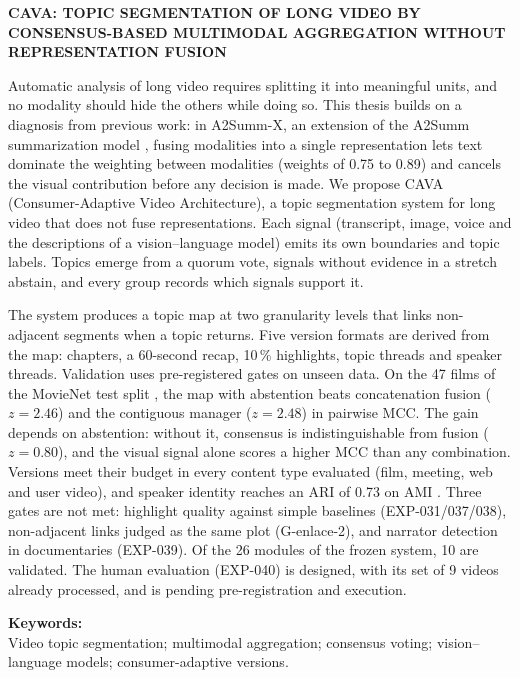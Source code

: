 
\begin{center}
\large \vspace{-1.5cm} \textbf{CAVA: TOPIC SEGMENTATION OF LONG VIDEO BY CONSENSUS-BASED MULTIMODAL AGGREGATION WITHOUT REPRESENTATION FUSION}
\end{center}

Automatic analysis of long video requires splitting it into meaningful units, and no
modality should hide the others while doing so. This thesis builds on a diagnosis from
previous work: in A2Summ-X, an extension of the A2Summ summarization model
\cite{he2023a2summ}, fusing modalities into a single representation lets text dominate the
weighting between modalities (weights of 0.75 to 0.89) and cancels the visual contribution
before any decision is made. We propose CAVA (Consumer-Adaptive Video Architecture), a topic
segmentation system for long video that does not fuse representations. Each signal
(transcript, image, voice and the descriptions of a vision--language model) emits its own
boundaries and topic labels. Topics emerge from a quorum vote, signals without evidence in a
stretch abstain, and every group records which signals support it.

The system produces a topic map at two granularity levels that links non-adjacent segments
when a topic returns. Five version formats are derived from the map: chapters, a 60-second
recap, 10\,\% highlights, topic threads and speaker threads. Validation uses pre-registered
gates on unseen data. On the 47 films of the MovieNet test split \cite{huang2020movienet},
the map with abstention beats concatenation fusion ($z = 2.46$) and the contiguous manager
($z = 2.48$) in pairwise MCC. The gain depends on abstention: without it, consensus is
indistinguishable from fusion ($z = 0.80$), and the visual signal alone scores a higher MCC
than any combination. Versions meet their budget in every content type evaluated (film,
meeting, web and user video), and speaker identity reaches an ARI of 0.73 on AMI
\cite{carletta2007ami}. Three gates are not met: highlight quality against simple baselines
(EXP-031/037/038), non-adjacent links judged as the same plot (G-enlace-2), and narrator
detection in documentaries (EXP-039). Of the 26 modules of the frozen system, 10 are
validated. The human evaluation (EXP-040) is designed, with its set of 9 videos already
processed, and is pending pre-registration and execution.

\vspace{0.5em}
\noindent \textbf{Keywords:}\\
\noindent Video topic segmentation; multimodal aggregation; consensus voting;
vision--language models; consumer-adaptive versions.
